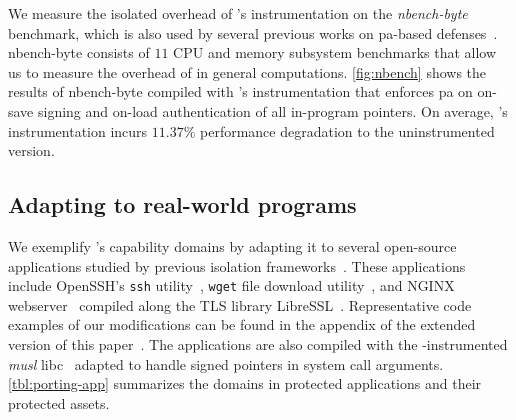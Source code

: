 {}
\label{sec:evaluation:nbench}
We measure the isolated overhead of \thename's instrumentation on the \emph{nbench-byte}~\cite{nbench} benchmark, which is also used by several previous works on \gls{pa}-based defenses~\cite{pactight,pac-it-up}.
nbench-byte consists of $11$ CPU and memory subsystem benchmarks that allow us to measure the overhead of \thename in general computations.
\autoref{fig:nbench} shows the results of nbench-byte compiled with \thename's instrumentation that enforces \gls{pa} on on-save signing and on-load authentication of all in-program pointers.
On average, \thename's instrumentation incurs $11.37\%$ performance degradation to the uninstrumented version.


% 








\subsection{Adapting \thename to real-world programs}
We exemplify \thename's capability domains by adapting it to several open-source applications studied by previous isolation frameworks~\cite{erim,chen2016shreds,ptrsplit}. 
These applications include OpenSSH's \texttt{ssh} utility~\cite{openssh}, \texttt{wget} file download utility~\cite{wget}, and NGINX webserver~\cite{nginx} compiled along the TLS library LibreSSL~\cite{libressl}. 
Representative code examples of our modifications can be found in the appendix of the extended version of this paper~\cite{capacity-extended}.
The applications are also compiled with the \thename-instrumented \emph{musl} libc~\cite{musl} adapted to handle signed pointers in system call arguments.
\autoref{tbl:porting-app} summarizes the \thename domains in protected applications and their protected assets.


